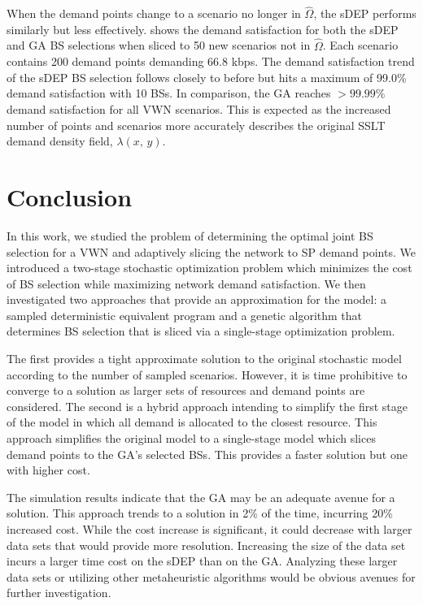 \documentclass[conference]{IEEEtran}
\begin{document}
When the demand points change to a scenario no longer in $\hat{\Omega}$, the sDEP performs similarly but less effectively.   shows the demand satisfaction for both the sDEP and GA BS selections when sliced to 50 new scenarios not in $\hat{\Omega}$.  Each scenario contains 200 demand points demanding 66.8 kbps.  The demand satisfaction trend of the sDEP BS selection follows closely to before but hits a maximum of 99.0\% demand satisfaction with 10 BSs.  In comparison, the GA reaches $> 99.99\%$ demand satisfaction for all VWN scenarios.  This is expected as the increased number of points and scenarios more accurately describes the original SSLT demand density field, $\lambda\left( x,\, y \right)$.

\section{Conclusion} \label{sec:conclusion}

In this work, we studied the problem of determining the optimal joint BS selection for a VWN and adaptively slicing the network to SP demand points.  We introduced a two-stage stochastic optimization problem which minimizes the cost of BS selection while maximizing network demand satisfaction.  We then investigated two approaches that provide an approximation for the model: a sampled deterministic equivalent program and a genetic algorithm that determines BS selection that is sliced via a single-stage optimization problem.

The first provides a tight approximate solution to the original stochastic model according to the number of sampled scenarios.  However, it is time prohibitive to converge to a solution as larger sets of resources and demand points are considered.  The second is a hybrid approach intending to simplify the first stage of the model in which all demand is allocated to the closest resource.  This approach simplifies the original model to a single-stage model which slices demand points to the GA's selected BSs.  This provides a faster solution but one with higher cost.

The simulation results indicate that the GA may be an adequate avenue for a solution.  This approach trends to a solution in 2\% of the time, incurring 20\% increased cost.  While the cost increase is significant, it could decrease with larger data sets that would provide more resolution.  Increasing the size of the data set incurs a larger time cost on the sDEP than on the GA.  Analyzing these larger data sets or utilizing other metaheuristic algorithms would be obvious avenues for further investigation.



\end{document}
